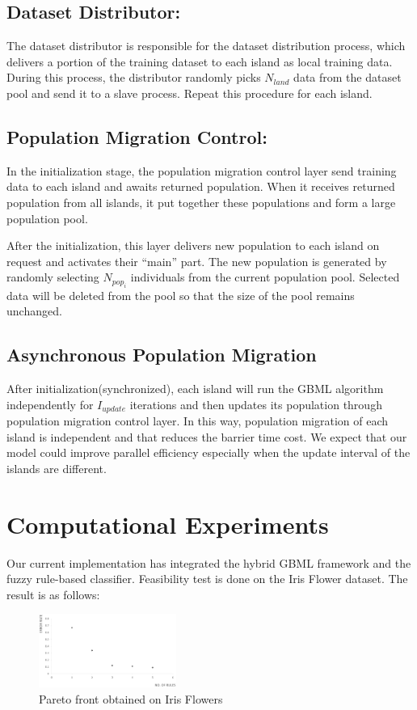 \documentclass[conference]{IEEEtran}
\begin{document}
	\subsection{Dataset Distributor:}
	The dataset distributor is responsible for the dataset distribution process, which delivers a portion of the training dataset to each island as local training data. During this process, the distributor randomly picks $N_{land}$ data from the dataset pool and send it to a slave process. Repeat this procedure for each island.
  \subsection{Population Migration Control:}
  In the initialization stage, the population migration control layer send training data to each island and awaits returned population. When it receives returned population from all islands, it put together these populations and form a large population pool. 
	
	After the initialization, this layer delivers new population to each island on request and activates their “main” part. The new population is generated by randomly selecting $ N_{pop_{i}}$ individuals from the current population pool. Selected data will be deleted from the pool so that the size of the pool remains unchanged.
	
  \subsection{Asynchronous Population Migration}
  After initialization(synchronized), each island will run the GBML algorithm independently for $I_{update}$ iterations and then updates its population through population migration control layer. In this way, population migration of each island is independent and that reduces the barrier time cost. We expect that our model could improve parallel efficiency especially when the update interval of the islands are different. 
  
  
  \section{Computational Experiments}

	 Our current implementation has integrated the hybrid GBML framework and the fuzzy rule-based classifier. Feasibility test is done on the Iris Flower dataset. The result is as follows:

 \begin{figure}[H]
 	\centering
 	\includegraphics[width=0.4\textwidth]{figures/iris.png}
 	\caption{Pareto front obtained on Iris Flowers}\label{fig:digit}
 \end{figure}
\end{document}
